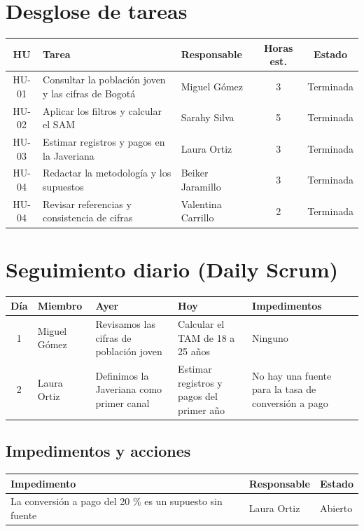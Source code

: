 \documentclass[11pt,a4paper]{article}
\begin{document}
\section{Desglose de tareas}

\begin{tabularx}{\textwidth}{c X l c c}
  \toprule
  \textbf{HU} & \textbf{Tarea} & \textbf{Responsable} & \textbf{Horas est.} & \textbf{Estado} \\
  \midrule
  HU-01 & Consultar la población joven y las cifras de Bogotá & Miguel Gómez & 3 & Terminada \\
  HU-02 & Aplicar los filtros y calcular el SAM & Sarahy Silva & 5 & Terminada \\
  HU-03 & Estimar registros y pagos en la Javeriana & Laura Ortiz & 3 & Terminada \\
  HU-04 & Redactar la metodología y los supuestos & Beiker Jaramillo & 3 & Terminada \\
  HU-04 & Revisar referencias y consistencia de cifras & Valentina Carrillo & 2 & Terminada \\
  \bottomrule
\end{tabularx}

\section{Seguimiento diario (Daily Scrum)}

\begin{tabularx}{\textwidth}{c l X X X}
  \toprule
  \textbf{Día} & \textbf{Miembro} & \textbf{Ayer} & \textbf{Hoy} & \textbf{Impedimentos} \\
  \midrule
  1 & Miguel Gómez & Revisamos las cifras de población joven & Calcular el TAM de 18 a 25 años & Ninguno \\
  2 & Laura Ortiz & Definimos la Javeriana como primer canal & Estimar registros y pagos del primer año & No hay una fuente para la tasa de conversión a pago \\
  \bottomrule
\end{tabularx}

\subsection{Impedimentos y acciones}

\begin{tabularx}{\textwidth}{X l l}
  \toprule
  \textbf{Impedimento} & \textbf{Responsable} & \textbf{Estado} \\
  \midrule
  La conversión a pago del 20 \% es un supuesto sin fuente & Laura Ortiz & Abierto \\
  \bottomrule
\end{tabularx}
\end{document}
